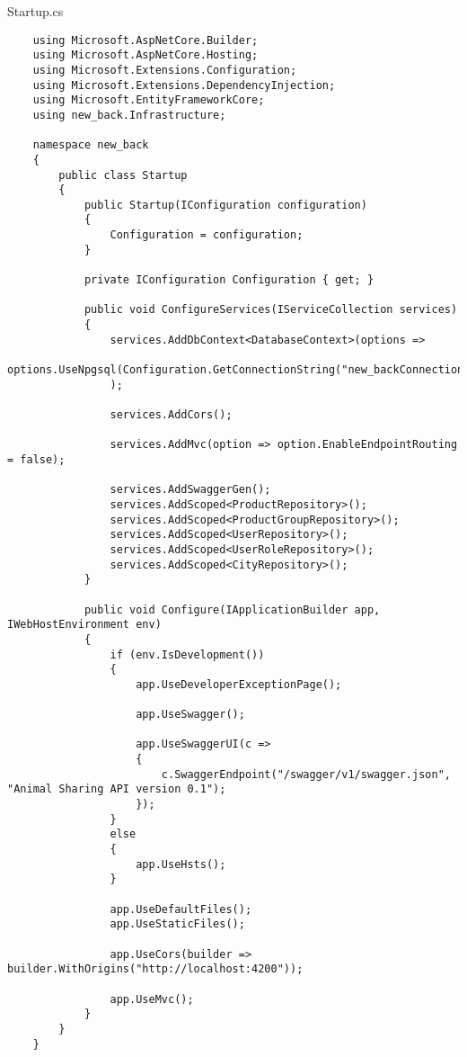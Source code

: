 Startup.cs
\lstset{style=sharpc}
\begin{lstlisting}
    using Microsoft.AspNetCore.Builder;
    using Microsoft.AspNetCore.Hosting;
    using Microsoft.Extensions.Configuration;
    using Microsoft.Extensions.DependencyInjection;
    using Microsoft.EntityFrameworkCore;
    using new_back.Infrastructure;
    
    namespace new_back
    {
        public class Startup
        {
            public Startup(IConfiguration configuration)
            {
                Configuration = configuration;
            }
    
            private IConfiguration Configuration { get; }
    
            public void ConfigureServices(IServiceCollection services)
            {
                services.AddDbContext<DatabaseContext>(options =>
                    options.UseNpgsql(Configuration.GetConnectionString("new_backConnection"))
                );
    
                services.AddCors();
    
                services.AddMvc(option => option.EnableEndpointRouting = false);
    
                services.AddSwaggerGen();
                services.AddScoped<ProductRepository>();
                services.AddScoped<ProductGroupRepository>();
                services.AddScoped<UserRepository>();
                services.AddScoped<UserRoleRepository>();
                services.AddScoped<CityRepository>();
            }
    
            public void Configure(IApplicationBuilder app, IWebHostEnvironment env)
            {
                if (env.IsDevelopment())
                {
                    app.UseDeveloperExceptionPage();
    
                    app.UseSwagger();
    
                    app.UseSwaggerUI(c =>
                    {
                        c.SwaggerEndpoint("/swagger/v1/swagger.json", "Animal Sharing API version 0.1");
                    });
                }
                else
                {
                    app.UseHsts();
                }
    
                app.UseDefaultFiles();
                app.UseStaticFiles();
    
                app.UseCors(builder => builder.WithOrigins("http://localhost:4200"));
    
                app.UseMvc();
            }
        }
    }
\end{lstlisting}

